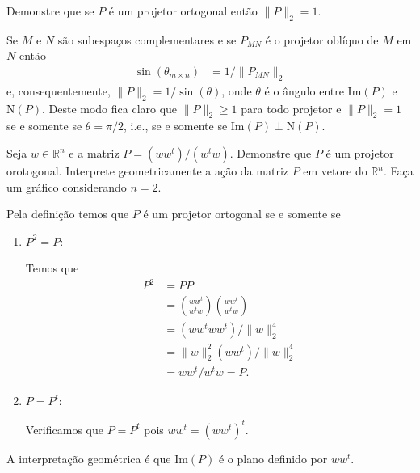 \begin{questions}
     Demonstre que se $P$ \'{e} um projetor ortogonal ent\~{a}o $\| P \|_2 = 1$.
    \begin{solution}
        Se $M$ e $N$ s\~{a}o subespa\c{c}os complementares e se $P_{MN}$ \'{e} o projetor obl\'{i}quo de $M$ em $N$ ent\~{a}o
        \begin{align*}
            \sin(\theta_{m \times n}) &= 1 / \| P_{MN} \|_2
        \end{align*}
        e, consequentemente, $\| P \|_2 = 1 / \sin(\theta)$, onde $\theta$ \'{e} o \^{a}ngulo entre $\text{Im}(P)$ e $\text{N}(P)$. Deste modo fica claro que $\| P \|_2 \geq 1$ para todo projetor e $\| P \|_2 = 1$ se e somente se $\theta = \pi / 2$, i.e., se e somente se $\text{Im}(P) \perp \text{N}(P)$.
    \end{solution}

    \question Seja $w \in \mathbb{R}^n$ e a matriz $P = \left( w w^t \right) / \left( w^t w \right)$. Demonstre que $P$ \'{e} um projetor orotogonal. Interprete geometricamente a a\c{c}\~{a}o da matriz $P$ em vetore do $\mathbb{R}^n$. Fa\c{c}a um gr\'{a}fico considerando $n = 2$.
    \begin{solution}
        Pela defini\c{c}\~{a}o temos que $P$ \'{e} um projetor ortogonal se e somente se
        \begin{enumerate}
            \item $P^2 = P$:
                
                Temos que
                \begin{align*}
                    P^2 &= P P \\
                    &= \left( \frac{w w^t}{w^t w} \right) \left( \frac{w w^t}{w^t w} \right) \\
                    &= \left( w w^t w w^t \right) / \| w \|_2^4 \\
                    &= \| w \|_2^2 \left( w w^t \right) / \| w \|_2^4 \\
                    &= w w^t / w^t w = P.
                \end{align*}

            \item $P = P^t$:
                
                Verificamos que $P = P^t$ pois $w w^t = \left( w w^t \right)^t$.
        \end{enumerate}

        A interpreta\c{c}\~{a}o geom\'{e}trica \'{e} que $\text{Im}(P)$ \'{e} o plano definido por $w w^t$.


\end{solution}
\end{questions}

